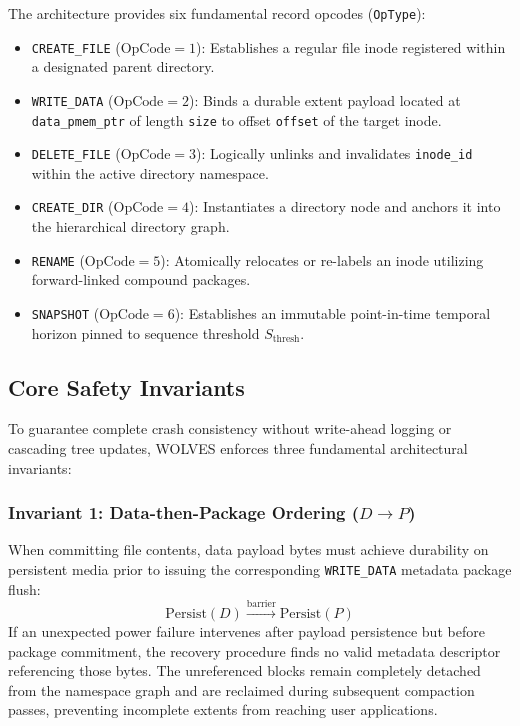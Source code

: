 \documentclass[conference]{IEEEtran}
\begin{document}
The architecture provides six fundamental record opcodes (\texttt{OpType}):
\begin{itemize}
    \item \texttt{CREATE\_FILE} ($\text{OpCode} = 1$): Establishes a regular file inode registered within a designated parent directory.
    \item \texttt{WRITE\_DATA} ($\text{OpCode} = 2$): Binds a durable extent payload located at \texttt{data\_pmem\_ptr} of length \texttt{size} to offset \texttt{offset} of the target inode.
    \item \texttt{DELETE\_FILE} ($\text{OpCode} = 3$): Logically unlinks and invalidates \texttt{inode\_id} within the active directory namespace.
    \item \texttt{CREATE\_DIR} ($\text{OpCode} = 4$): Instantiates a directory node and anchors it into the hierarchical directory graph.
    \item \texttt{RENAME} ($\text{OpCode} = 5$): Atomically relocates or re-labels an inode utilizing forward-linked compound packages.
    \item \texttt{SNAPSHOT} ($\text{OpCode} = 6$): Establishes an immutable point-in-time temporal horizon pinned to sequence threshold $S_{\text{thresh}}$.
\end{itemize}

\subsection{Core Safety Invariants}
To guarantee complete crash consistency without write-ahead logging or cascading tree updates, WOLVES enforces three fundamental architectural invariants:

\subsubsection{Invariant 1: Data-then-Package Ordering ($D \rightarrow P$)}
When committing file contents, data payload bytes must achieve durability on persistent media prior to issuing the corresponding \texttt{WRITE\_DATA} metadata package flush:
\begin{equation}
    \text{Persist}(D) \xrightarrow{\text{barrier}} \text{Persist}(P)
\end{equation}
If an unexpected power failure intervenes after payload persistence but before package commitment, the recovery procedure finds no valid metadata descriptor referencing those bytes. The unreferenced blocks remain completely detached from the namespace graph and are reclaimed during subsequent compaction passes, preventing incomplete extents from reaching user applications.
\end{document}
